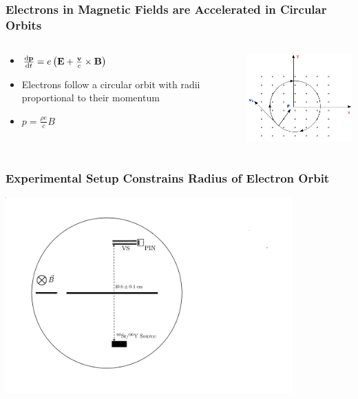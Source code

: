 \documentclass{beamer}
\begin{document}
\begin{frame}
  \frametitle{Electrons in Magnetic Fields are Accelerated in Circular Orbits}
  \begin{columns}
    \begin{column}{0.5\textwidth}
      \begin{itemize}
        \item
          $\dv{\vb{p}}{t} = e \left(\vb{E} + \frac{\vb{v}}{c} \times \vb{B}\right)$
        \item Electrons follow a circular orbit with radii proportional to their momentum
        \item $p = \frac{\rho e}{c} B$
      \end{itemize}
\end{column}
    \begin{column}{0.5\textwidth}
  \includegraphics[width=6cm]{lorentz.png}
\end{column}
\end{columns}
\end{frame}

\begin{frame}
  \frametitle{Experimental Setup Constrains Radius of Electron Orbit}
  \includegraphics[width=11cm]{setup1.png}
\end{frame}
\end{document}
